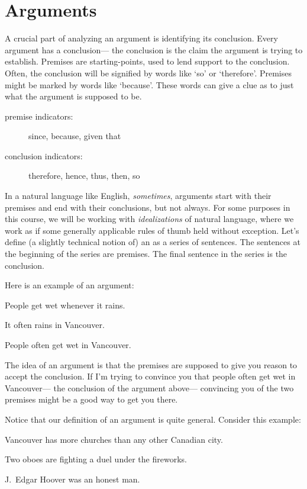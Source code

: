 \section{Arguments}
A crucial part of analyzing an argument is identifying its conclusion. Every argument has a conclusion--- the conclusion is the claim the argument is trying to establish. Premises are starting-points, used to lend support to the conclusion. Often, the conclusion will be signified by words like `so' or `therefore'. Premises might be marked by words like `because'. These words can give a clue as to just what the argument is supposed to be.

\begin{description}
\item[premise indicators:] since, because, given that
\item[conclusion indicators:] therefore, hence, thus, then, so
\end{description}

In a natural language like English, \emph{sometimes}, arguments start with their premises and end with their conclusions, but not always. For some purposes in this course, we will be working with \emph{idealizations} of natural language, where we work as if some generally applicable rules of thumb held without exception. Let's define (a slightly technical notion of) an  as a series of sentences. The sentences at the beginning of the series are premises. The final sentence in the series is the conclusion.

Here is an example of an argument:

\begin{earg}
\item[] People get wet whenever it rains.
\item[] It often rains in Vancouver.
\item[\therefore] People often get wet in Vancouver.
\end{earg}

The idea of an argument is that the premises are supposed to give you reason to accept the conclusion. If I'm trying to convince you that people often get wet in Vancouver--- the conclusion of the argument above--- convincing you of the two premises might be a good way to get you there.

Notice that our definition of an argument is quite general. Consider this example:
\begin{earg}
\item[] Vancouver has more churches than any other Canadian city.
\item[] Two oboes are fighting a duel under the fireworks.
\item[\therefore] J.\ Edgar Hoover was an honest man.
\end{earg}

